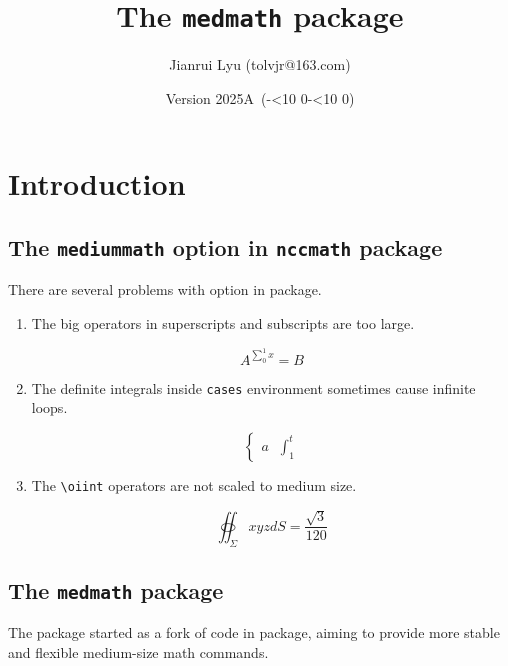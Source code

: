 \documentclass[oneside,11pt]{article}
\newcommand*{\myversion}{2025A}
\newcommand*{\mydate}{Version \myversion\ (\the\year-\mylpad\month-\mylpad\day)}
\newcommand*{\mylpad}[1]{\ifnum#1<10 0\the#1\else\the#1\fi}
\begin{document}
\title{\textsf{\color{green3}The \texttt{medmath} package}}
\author{Jianrui Lyu (tolvjr@163.com)}
\date{\mydate}
\maketitle

\section{Introduction}

\subsection{The \texttt{mediummath} option in \texttt{nccmath} package}

There are several problems with  option in  package.

\begin{enumerate}
  \item The big operators in superscripts and subscripts are too large.
\begin{demohigh}
\[A^{\sum_{0}^{1}x}=B\]
\end{demohigh}
  \item The definite integrals inside \texttt{cases} environment sometimes cause infinite loops.
\begin{codehigh}
\[\begin{cases}
 a & \int_1^t
\end{cases}\]
\end{codehigh}
  \item The \verb!\oiint! operators are not scaled to medium size.
\begin{demohigh}
\[\oiint_{\Sigma}xyzdS=\frac{\sqrt{3}}{120}\]
\end{demohigh}
\end{enumerate}

\subsection{The \texttt{medmath} package}

\makeatletter
\mdm@activate@all
\makeatother

The  package started as a fork of  code in 
package, aiming to provide more stable and flexible medium-size math commands.
\end{document}
